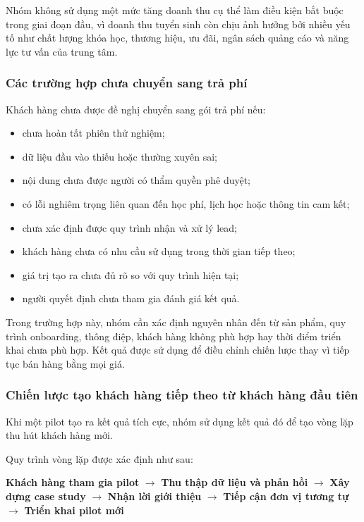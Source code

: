 Nhóm không sử dụng một mức tăng doanh thu cụ thể làm điều kiện bắt buộc trong giai đoạn đầu, vì doanh thu tuyển sinh còn chịu ảnh hưởng bởi nhiều yếu tố như chất lượng khóa học, thương hiệu, ưu đãi, ngân sách quảng cáo và năng lực tư vấn của trung tâm.

\subsubsection{Các trường hợp chưa chuyển sang trả phí}

Khách hàng chưa được đề nghị chuyển sang gói trả phí nếu:

\begin{itemize}
    \item chưa hoàn tất phiên thử nghiệm;
    \item dữ liệu đầu vào thiếu hoặc thường xuyên sai;
    \item nội dung chưa được người có thẩm quyền phê duyệt;
    \item có lỗi nghiêm trọng liên quan đến học phí, lịch học hoặc thông tin cam kết;
    \item chưa xác định được quy trình nhận và xử lý lead;
    \item khách hàng chưa có nhu cầu sử dụng trong thời gian tiếp theo;
    \item giá trị tạo ra chưa đủ rõ so với quy trình hiện tại;
    \item người quyết định chưa tham gia đánh giá kết quả.
\end{itemize}

Trong trường hợp này, nhóm cần xác định nguyên nhân đến từ sản phẩm, quy trình onboarding, thông điệp, khách hàng không phù hợp hay thời điểm triển khai chưa phù hợp. Kết quả được sử dụng để điều chỉnh chiến lược thay vì tiếp tục bán hàng bằng mọi giá.

\subsubsection{Chiến lược tạo khách hàng tiếp theo từ khách hàng đầu tiên}

Khi một pilot tạo ra kết quả tích cực, nhóm sử dụng kết quả đó để tạo vòng lặp thu hút khách hàng mới.

Quy trình vòng lặp được xác định như sau:

\begin{center}
\textbf{Khách hàng tham gia pilot}
$\rightarrow$
\textbf{Thu thập dữ liệu và phản hồi}
$\rightarrow$
\textbf{Xây dựng case study}
$\rightarrow$
\textbf{Nhận lời giới thiệu}
$\rightarrow$
\textbf{Tiếp cận đơn vị tương tự}
$\rightarrow$
\textbf{Triển khai pilot mới}
\end{center}

